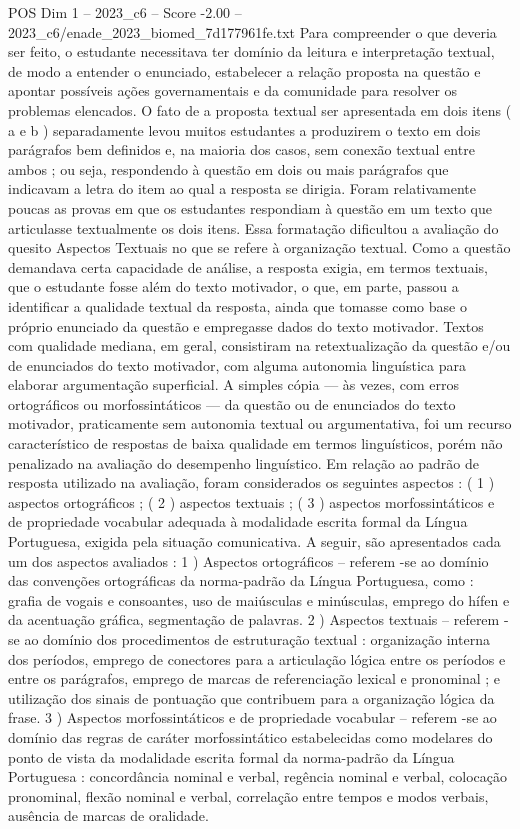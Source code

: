 \begin{textsample}{POS Dim 1 – 2023\_c6 – Score -2.00 – 2023\_c6/enade\_2023\_biomed\_7d177961fe.txt}
Para compreender o que deveria ser feito, o estudante necessitava ter domínio da leitura e interpretação textual, de modo a entender o enunciado, estabelecer a relação proposta na questão e apontar possíveis ações governamentais e da comunidade para resolver os problemas elencados.
O fato de a proposta textual ser apresentada em dois itens ( a e b ) separadamente levou muitos estudantes a produzirem o texto em dois parágrafos bem definidos e, na maioria dos casos, sem conexão textual entre ambos ; ou seja, respondendo à questão em dois ou mais parágrafos que indicavam a letra do item ao qual a resposta se dirigia.
Foram relativamente poucas as provas em que os estudantes respondiam à questão em um texto que articulasse textualmente os dois itens.
Essa formatação dificultou a avaliação do quesito Aspectos Textuais no que se refere à organização textual.
Como a questão demandava certa capacidade de análise, a resposta exigia, em termos textuais, que o estudante fosse além do texto motivador, o que, em parte, passou a identificar a qualidade textual da resposta, ainda que tomasse como base o próprio enunciado da questão e empregasse dados do texto motivador.
Textos com qualidade mediana, em geral, consistiram na retextualização da questão e/ou de enunciados do texto motivador, com alguma autonomia linguística para elaborar argumentação superficial.
A simples cópia — às vezes, com erros ortográficos ou morfossintáticos — da questão ou de enunciados do texto motivador, praticamente sem autonomia textual ou argumentativa, foi um recurso característico de respostas de baixa qualidade em termos linguísticos, porém não penalizado na avaliação do desempenho linguístico.
Em relação ao padrão de resposta utilizado na avaliação, foram considerados os seguintes aspectos : ( 1 ) aspectos ortográficos ; ( 2 ) aspectos textuais ; ( 3 ) aspectos morfossintáticos e de propriedade vocabular adequada à modalidade escrita formal da Língua Portuguesa, exigida pela situação comunicativa.
A seguir, são apresentados cada um dos aspectos avaliados : 1 ) Aspectos ortográficos – referem -se ao domínio das convenções ortográficas da norma-padrão da Língua Portuguesa, como : grafia de vogais e consoantes, uso de maiúsculas e minúsculas, emprego do hífen e da acentuação gráfica, segmentação de palavras. 2 ) Aspectos textuais – referem -se ao domínio dos procedimentos de estruturação textual : organização interna dos períodos, emprego de conectores para a articulação lógica entre os períodos e entre os parágrafos, emprego de marcas de referenciação lexical e pronominal ; e utilização dos sinais de pontuação que contribuem para a organização lógica da frase. 3 ) Aspectos morfossintáticos e de propriedade vocabular – referem -se ao domínio das regras de caráter morfossintático estabelecidas como modelares do ponto de vista da modalidade escrita formal da norma-padrão da Língua Portuguesa : concordância nominal e verbal, regência nominal e verbal, colocação pronominal, flexão nominal e verbal, correlação entre tempos e modos verbais, ausência de marcas de oralidade.

\end{textsample}
